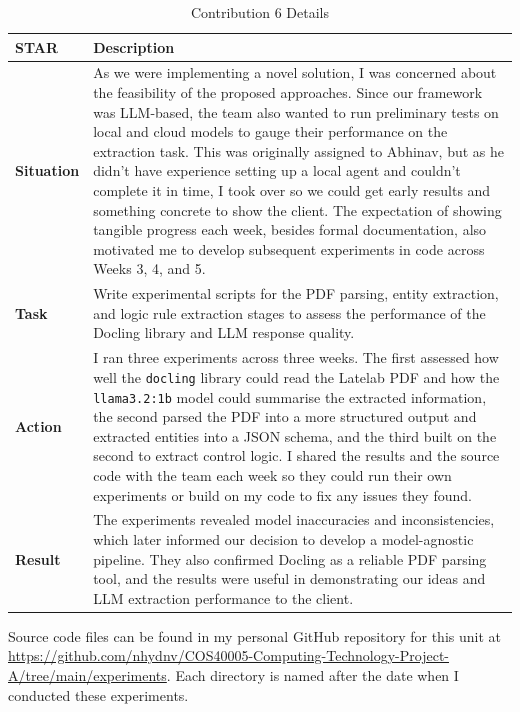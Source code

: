 \documentclass{article}
\begin{document}
    \begin{xltabular}{\textwidth}{p{2cm} X}
    \caption{Contribution 6 Details} \\
    \hline
    \textbf{STAR} & \textbf{Description} \\
    \hline
    \endfirsthead

    \hline
    \endlastfoot

    \textbf{Situation} & As we were implementing a novel solution, I was concerned about the feasibility of the proposed approaches. Since our framework was LLM-based, the team also wanted to run preliminary tests on local and cloud models to gauge their performance on the extraction task. This was originally assigned to Abhinav, but as he didn't have experience setting up a local agent and couldn't complete it in time, I took over so we could get early results and something concrete to show the client. The expectation of showing tangible progress each week, besides formal documentation, also motivated me to develop subsequent experiments in code across Weeks 3, 4, and 5. \\

    \textbf{Task} & Write experimental scripts for the PDF parsing, entity extraction, and logic rule extraction stages to assess the performance of the Docling library and LLM response quality. \\

    \textbf{Action} & I ran three experiments across three weeks. The first assessed how well the \texttt{docling} library could read the Latelab PDF and how the \texttt{llama3.2:1b} model could summarise the extracted information, the second parsed the PDF into a more structured output and extracted entities into a JSON schema, and the third built on the second to extract control logic. I shared the results and the source code with the team each week so they could run their own experiments or build on my code to fix any issues they found. \\

    \textbf{Result} & The experiments revealed model inaccuracies and inconsistencies, which later informed our decision to develop a model-agnostic pipeline. They also confirmed Docling as a reliable PDF parsing tool, and the results were useful in demonstrating our ideas and LLM extraction performance to the client. \\

    \end{xltabular}

    Source code files can be found in my personal GitHub repository for this unit at \url{https://github.com/nhydnv/COS40005-Computing-Technology-Project-A/tree/main/experiments}. Each directory is named after the date when I conducted these experiments.
\end{document}
